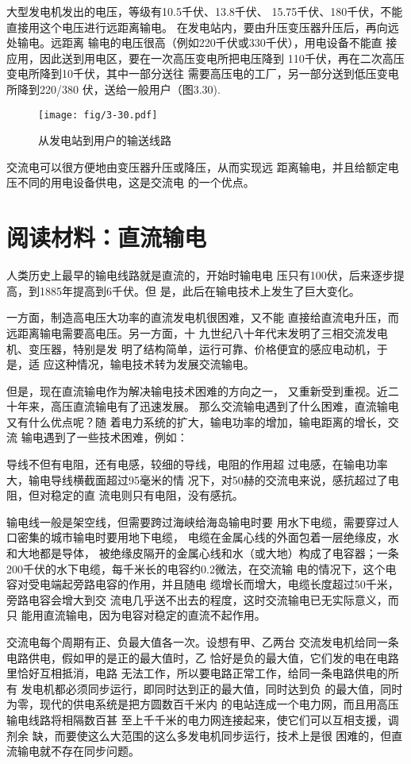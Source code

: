 大型发电机发出的电压，等级有10.5千伏、13.8千伏、
15.75千伏、180千伏，不能直接用这个电压进行远距离输电。
在发电站内，要由升压变压器升压后，再向远处输电。远距离
输电的电压很高（例如220千伏或330千伏），用电设备不能直
接应用，因此送到用电区，要在一次高压变电所把电压降到
110千伏，再在二次高压变电所降到10千伏，其中一部分送往
需要高压电的工厂，另一部分送到低压变电所降到220/380
伏，送给一般用户（图3.30).
\begin{figure}[htp]\centering
    \texttt{[image: fig/3-30.pdf]}
    \caption{从发电站到用户的输送线路}
    \end{figure}

交流电可以很方便地由变压器升压或降压，从而实现远
距离输电，并且给额定电压不同的用电设备供电，这是交流电
的一个优点。

\section*{阅读材料：直流输电}
人类历史上最早的输电线路就是直流的，开始时输电电
压只有100伏，后来逐步提高，到1885年提高到6千伏。但
是，此后在输电技术上发生了巨大变化。

一方面，制造高电压大功率的直流发电机很困难，又不能
直接给直流电升压，而远距离输电需要高电压。另一方面，十
九世纪八十年代末发明了三相交流发电机、变压器，特别是发
明了结构简单，运行可靠、价格便宜的感应电动机，于是，适
应这种情况，输电技术转为发展交流输电。

但是，现在直流输电作为解决输电技术困难的方向之一，
又重新受到重视。近二十年来，高压直流输电有了迅速发展。
那么交流输电遇到了什么困难，直流输电又有什么优点呢？随
着电力系统的扩大，输电功率的增加，输电距离的增长，交流
输电遇到了一些技术困难，例如：

导线不但有电阻，还有电感，较细的导线，电阻的作用超
过电感，在输电功率大，输电导线横截面超过95毫米的情
况下，对50赫的交流电来说，感抗超过了电阻，但对稳定的直
流电则只有电阻，没有感抗。

输电线一般是架空线，但需要跨过海峡给海岛输电时要
用水下电缆，需要穿过人口密集的城市输电时要用地下电缆，
电缆在金属心线的外面包着一层绝缘皮，水和大地都是导体，
被绝缘皮隔开的金属心线和水（或大地）构成了电容器；一条
200千伏的水下电缆，每千米长的电容约0.2微法，在交流输
电的情况下，这个电容对受电端起旁路电容的作用，并且随电
缆增长而增大，电缆长度超过50千米，旁路电容会增大到交
流电几乎送不出去的程度，这时交流输电已无实际意义，而只
能用直流输电，因为电容对稳定的直流不起作用。

交流电每个周期有正、负最大值各一次。设想有甲、乙两台
交流发电机给同一条电路供电，假如甲的是正的最大值时，乙
恰好是负的最大值，它们发的电在电路里恰好互相抵消，电路
无法工作，所以要电路正常工作，给同一条电路供电的所有
发电机都必须同步运行，即同时达到正的最大值，同时达到负
的最大值，同时为零，现代的供电系统是把方圆数百千米内
的电站连成一个电力网，而且用高压输电线路将相隔数百甚
至上千千米的电力网连接起来，使它们可以互相支援，调剂余
缺，而要使这么大范围的这么多发电机同步运行，技术上是很
困难的，但直流输电就不存在同步问题。

